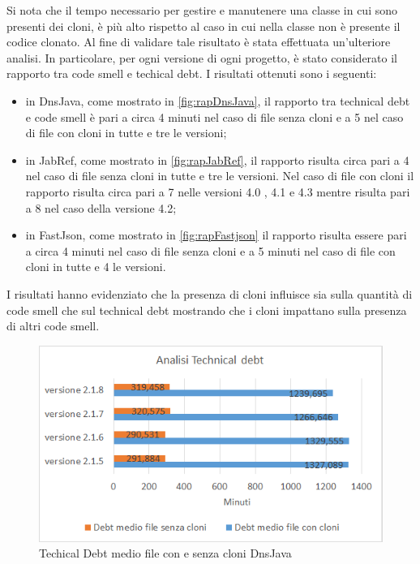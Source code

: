 Si nota che il tempo necessario per gestire e manutenere una classe in cui sono presenti dei cloni, è più alto rispetto al caso in cui nella classe non è presente il codice clonato. Al fine di validare tale risultato è stata effettuata un'ulteriore analisi. In particolare, per ogni versione di ogni progetto, è stato considerato il rapporto tra code smell e techical debt. I risultati ottenuti sono i seguenti:
\begin{itemize}
	\item in DnsJava, come mostrato in \autoref{fig:rapDnsJava}, il rapporto tra technical debt e code smell è pari a circa 4 minuti nel caso di file senza cloni e a 5 nel caso di file con cloni in tutte e tre le versioni;
	\item in JabRef, come mostrato in \autoref{fig:rapJabRef}, il rapporto risulta circa pari a 4 nel caso di file senza cloni in tutte e tre le versioni. Nel caso di file con cloni il rapporto risulta circa pari a 7 nelle versioni 4.0 , 4.1 e 4.3 mentre risulta pari a 8 nel caso della versione 4.2;
	\item in FastJson, come mostrato in \autoref{fig:rapFastjson} il rapporto risulta essere pari a circa 4 minuti nel caso di file senza cloni e a 5 minuti nel caso di file con cloni in tutte e 4 le versioni.
\end{itemize}
I risultati hanno evidenziato che la presenza di cloni influisce sia sulla quantità di code smell che sul technical debt mostrando che i cloni impattano sulla presenza di altri code smell.
\begin{figure}[h]
	\centering
	\includegraphics[scale=0.75, trim = 0cm 0cm 0cm 0cm, clip=true]{Grafici_dnsJava/TechnicalDebt.png}
	\caption{Techical Debt medio file con e senza cloni DnsJava}
	\label{fig:tdDnsJava}	
\end{figure}
